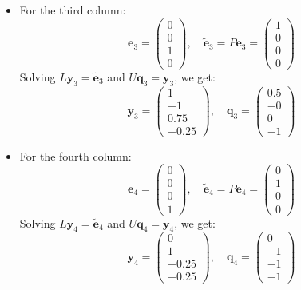 \documentclass{article}
\begin{document}
\begin{itemize}
    \item For the third column:
          \[
              \mathbf{e}_3 = \begin{pmatrix} 0 \\ 0 \\ 1 \\ 0 \end{pmatrix}, \quad
              \tilde{\mathbf{e}}_3 = P \mathbf{e}_3 = \begin{pmatrix} 1 \\ 0 \\ 0 \\ 0 \end{pmatrix}
          \]
          Solving \( L \mathbf{y}_3 = \tilde{\mathbf{e}}_3 \) and \( U \mathbf{q}_3 = \mathbf{y}_3 \), we get:
          \[
              \mathbf{y}_3 = \begin{pmatrix} 1 \\ -1 \\ 0.75 \\ -0.25 \end{pmatrix}, \quad
              \mathbf{q}_3 = \begin{pmatrix} 0.5 \\ -0 \\ 0 \\ -1 \end{pmatrix}
          \]

    \item For the fourth column:
          \[
              \mathbf{e}_4 = \begin{pmatrix} 0 \\ 0 \\ 0 \\ 1 \end{pmatrix}, \quad
              \tilde{\mathbf{e}}_4 = P \mathbf{e}_4 = \begin{pmatrix} 0 \\ 1 \\ 0 \\ 0 \end{pmatrix}
          \]
          Solving \( L \mathbf{y}_4 = \tilde{\mathbf{e}}_4 \) and \( U \mathbf{q}_4 = \mathbf{y}_4 \), we get:
          \[
              \mathbf{y}_4 = \begin{pmatrix} 0 \\ 1 \\ -0.25 \\ -0.25 \end{pmatrix}, \quad
              \mathbf{q}_4 = \begin{pmatrix} 0 \\ -1 \\ -1 \\ -1 \end{pmatrix}
          \]
\end{itemize}
\end{document}

